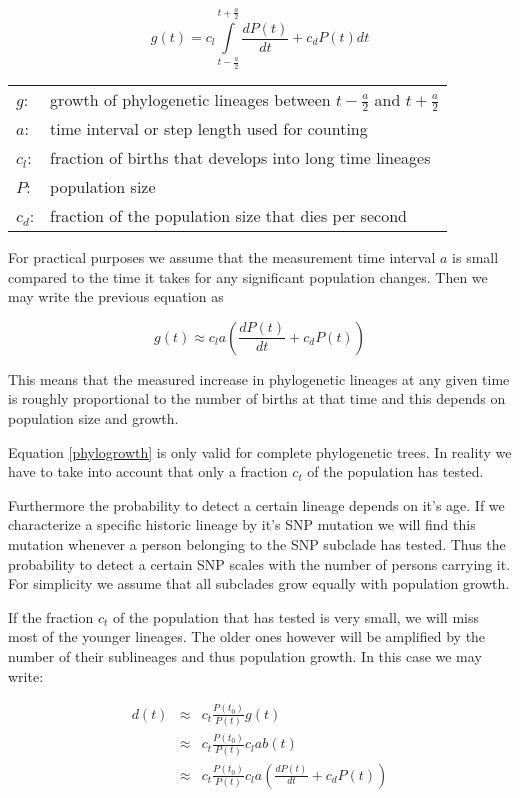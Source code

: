 \begin{equation}
g(t) = c_l \int\limits_{t-\frac{a}{2}}^{t+\frac{a}{2}} \frac{dP(t)}{dt} + c_{d} P(t) dt
\end{equation}

\begin{tabular}{ll}
$g$:     & growth of phylogenetic lineages between $t-\frac{a}{2}$ and $t+\frac{a}{2}$\\
$a$:     & time interval or step length used for counting\\
$c_l$:   & fraction of births that develops into long time lineages\\
$P$:     & population size\\
$c_{d}$: & fraction of the population size that dies per second
\end{tabular}
\vspace{1em}

For practical purposes we assume that the measurement time
interval $a$ is small compared to the time it takes for any
significant population changes. Then we may write the previous
equation as

\begin{equation}
g(t) \approx c_l a \left( \frac{dP(t)}{dt} + c_{d} P(t) \right) \label{phylogrowth}
\end{equation}

This means that the measured increase in phylogenetic lineages
at any given time is roughly proportional to the number of births
at that time and this depends on population size and growth.

Equation \ref{phylogrowth} is only valid for complete phylogenetic
trees. In reality we have to take into account that only a fraction
$c_t$ of the population has tested.

Furthermore the probability to detect a certain lineage depends
on it's age. If we characterize a specific historic lineage by
it's SNP mutation we will find this mutation whenever a person
belonging to the SNP subclade has tested. Thus the probability
to detect a certain SNP scales with the number of persons
carrying it. For simplicity we assume that all subclades grow
equally with population growth.

If the fraction $c_t$ of the population that has tested is
very small, we will miss most of the younger lineages. The
older ones however will be amplified by the number of their
sublineages and thus population growth.
In this case we may write:

\begin{eqnarray}
d(t) & \approx & c_t \frac{P(t_0)}{P(t)} g(t)\\
     & \approx & c_t \frac{P(t_0)}{P(t)} c_l a b(t) \\
     & \approx & c_t \frac{P(t_0)}{P(t)} c_l a \left( \frac{dP(t)}{dt} + c_{d} P(t) \right)
\end{eqnarray}

